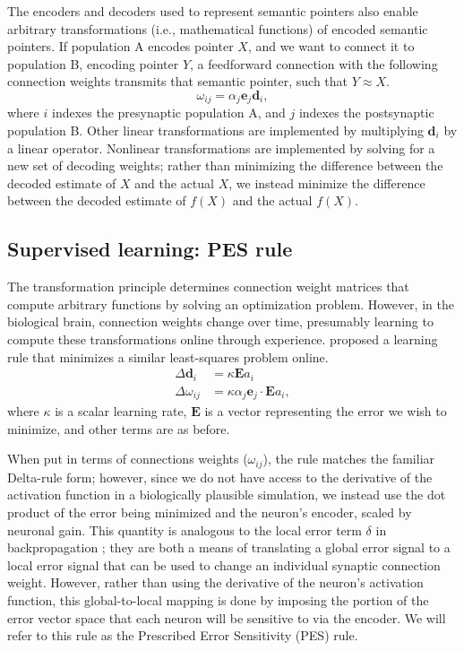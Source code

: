 \documentclass[10pt,letterpaper]{article}
\begin{document}
The encoders and decoders used to represent semantic pointers
also enable arbitrary transformations
(i.e., mathematical functions) of encoded semantic pointers.
If population A encodes pointer $X$,
and we want to connect it to population B, encoding pointer $Y$,
a feedforward connection with the following connection weights
transmits that semantic pointer, such that $Y \approx X$.
\begin{equation}
  \omega_{ij} = \alpha_j \mathbf{e}_j \mathbf{d}_i,
\end{equation}
where $i$ indexes the presynaptic population A,
and $j$ indexes the postsynaptic population B.
Other linear transformations
are implemented by multiplying $\mathbf{d}_i$
by a linear operator.
Nonlinear transformations are implemented
by solving for a new set of decoding weights;
rather than minimizing the difference
between the decoded estimate of $X$ and the actual $X$,
we instead minimize the difference between
the decoded estimate of $f(X)$ and the actual $f(X)$.

\subsection{Supervised learning: PES rule}

The transformation principle determines
connection weight matrices that compute
arbitrary functions by solving an optimization problem.
However, in the biological brain, connection weights
change over time, presumably learning to compute
these transformations online through experience.
 proposed a learning rule
that minimizes a similar least-squares
problem online.
\begin{align} \label{eq:pes}
  \Delta \mathbf{d}_i &= \kappa \mathbf{E} a_i \nonumber \\
  \Delta \omega_{ij} &= \kappa \alpha_j \mathbf{e}_j \cdot \mathbf{E} a_i,
\end{align}
where $\kappa$ is a scalar learning rate,
$\mathbf{E}$ is a vector representing the error we wish to minimize,
and other terms are as before.

When put in terms of connections weights ($\omega_{ij}$),
the rule matches the familiar Delta-rule form;
however, since we do not have access to the
derivative of the activation function
in a biologically plausible simulation,
we instead use the dot product of
the error being minimized and the neuron's encoder,
scaled by neuronal gain.
This quantity is analogous to the local error term
$\delta$ in backpropagation \cite{Rumelhart1986};
they are both a means of translating a global error signal
to a local error signal that can be used to
change an individual synaptic connection weight.
However, rather than using the derivative
of the neuron's activation function,
this global-to-local mapping is done
by imposing the portion of the error vector space
that each neuron will be sensitive to via the encoder.
We will refer to this rule as
the Prescribed Error Sensitivity (PES) rule.
\end{document}
